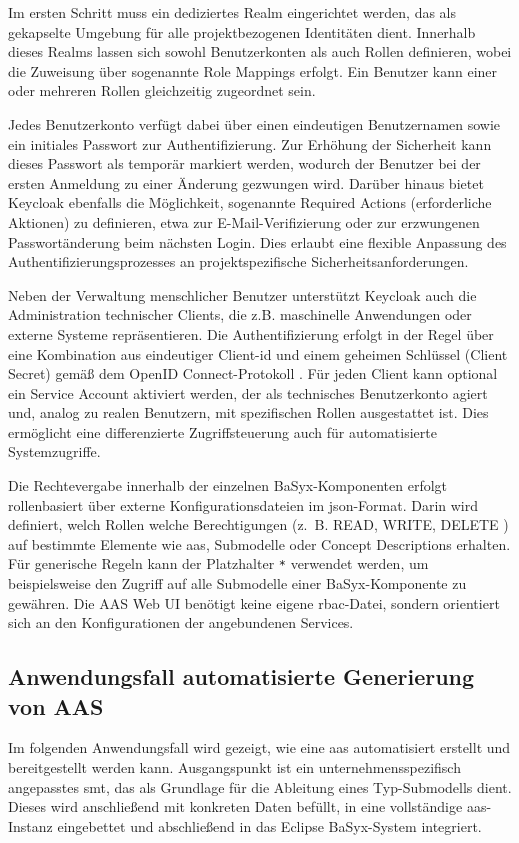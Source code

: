 Im ersten Schritt muss ein dediziertes Realm eingerichtet werden, das als gekapselte Umgebung für alle projektbezogenen Identitäten dient.  
Innerhalb dieses Realms lassen sich sowohl Benutzerkonten als auch Rollen definieren, wobei die Zuweisung über sogenannte Role Mappings erfolgt.  
Ein Benutzer kann einer oder mehreren Rollen gleichzeitig zugeordnet sein.

Jedes Benutzerkonto verfügt dabei über einen eindeutigen Benutzernamen sowie ein initiales Passwort zur Authentifizierung.  
Zur Erhöhung der Sicherheit kann dieses Passwort als temporär markiert werden, wodurch der Benutzer bei der ersten Anmeldung zu einer Änderung gezwungen wird.  
Darüber hinaus bietet Keycloak ebenfalls die Möglichkeit, sogenannte Required Actions (erforderliche Aktionen) zu definieren, etwa zur E-Mail-Verifizierung oder zur erzwungenen Passwortänderung beim nächsten Login.  
Dies erlaubt eine flexible Anpassung des Authentifizierungsprozesses an projektspezifische Sicherheitsanforderungen.

Neben der Verwaltung menschlicher Benutzer unterstützt Keycloak auch die Administration technischer Clients, die z.B. maschinelle Anwendungen oder externe Systeme repräsentieren.  
Die Authentifizierung erfolgt in der Regel über eine Kombination aus eindeutiger Client-\acs{id} und einem geheimen Schlüssel (Client Secret) gemäß dem OpenID Connect-Protokoll \cite{OpenID}.  
Für jeden Client kann optional ein Service Account aktiviert werden, der als technisches Benutzerkonto agiert und, analog zu realen Benutzern, mit spezifischen Rollen ausgestattet ist.  
Dies ermöglicht eine differenzierte Zugriffsteuerung auch für automatisierte Systemzugriffe.

Die Rechtevergabe innerhalb der einzelnen BaSyx-Komponenten erfolgt rollenbasiert über externe Konfigurationsdateien im \acs{json}-Format.  
Darin wird definiert, welch Rollen welche Berechtigungen (z.~B. READ, WRITE, DELETE ) auf bestimmte Elemente wie \acs{aas}, Submodelle oder Concept Descriptions erhalten.  
Für generische Regeln kann der Platzhalter \texttt{*} verwendet werden, um beispielsweise den Zugriff auf alle Submodelle einer BaSyx-Komponente zu gewähren.  
Die AAS Web UI benötigt keine eigene \acs{rbac}-Datei, sondern orientiert sich an den Konfigurationen der angebundenen Services.

\subsection{Anwendungsfall automatisierte Generierung von AAS}
Im folgenden Anwendungsfall wird gezeigt, wie eine \acs{aas} automatisiert erstellt und bereitgestellt werden kann.  
Ausgangspunkt ist ein unternehmensspezifisch angepasstes \acs{smt}, das als Grundlage für die Ableitung eines Typ-Submodells dient.  
Dieses wird anschließend mit konkreten Daten befüllt, in eine vollständige \acs{aas}-Instanz eingebettet und abschließend in das Eclipse BaSyx-System integriert.

